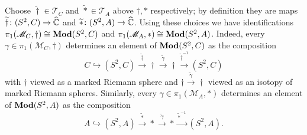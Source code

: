 \documentclass{amsart}
\begin{document}
Choose $\widetilde \dagger\in \mathscr T_C$ and
$\widetilde *\in \mathscr T_ A$ above $\dagger ,*$ respectively; by
definition they are maps $\widetilde \dagger\colon (S^2,C)\to {\widehat{{\mathbb C}}}$ and
$\widetilde *\colon (S^2,A)\to {\widehat{{\mathbb C}}}$. Using these choices we have
identifications $\pi_1(\mathscr M_C,\dagger)\cong \mathbf{\relax Mod}(S^2,C)$ and
$\pi_1(\mathscr M_A,*)\cong \mathbf{\relax Mod}(S^2,A)$. Indeed, every
$\gamma\in \pi_1(\mathscr M_C,\dagger)$ determines an element of
$\mathbf{\relax Mod}(S^2,C)$ as the composition
\begin{equation}\label{eq:ident:Mod with pi1:C}
C\hookrightarrow(S^2,C)\overset{\widetilde \dagger }{\longrightarrow} \dagger \overset{\widetilde\gamma}{\longrightarrow}\dagger \overset{\widetilde \dagger ^{-1}}{\longrightarrow}(S^2,C)
\end{equation}
with $\dagger$ viewed as a marked Riemann sphere and
$ \dagger \overset{\widetilde\gamma}{\longrightarrow}\dagger$ viewed
as an isotopy of marked Riemann spheres. Similarly, every
$\gamma\in \pi_1(\mathscr M_A,*)$ determines an element of
$\mathbf{\relax Mod}(S^2,A)$ as the composition
\begin{equation}\label{eq:ident:Mod with pi1:A}
  A \hookrightarrow (S^2,A)\overset{\widetilde * }{\longrightarrow} * \overset{\widetilde\gamma}{\longrightarrow}* \overset{\widetilde * ^{-1}}{\longrightarrow}(S^2,A).
\end{equation}
\end{document}
